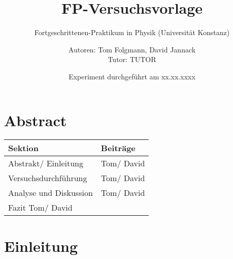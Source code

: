 \documentclass[
    oneside, 
    footinclude=off, 
    captions=tableheading, 
    DIV=12;usenames,
    dvipsnames
]{scrartcl}
\begin{document}
    \title{FP-Versuchsvorlage}
    \subtitle{Fortgeschrittenen-Praktikum in Physik (Universität Konstanz)}
    \author{Autoren: Tom Folgmann, David Jannack \\ \large{Tutor: TUTOR}}
    \date{Experiment durchgeführt am xx.xx.xxxx}
    \maketitle
    \thispagestyle{empty}
    
    \section*{Abstract}
        

    \vspace{2cm}
    \begin{table}[H]
        \centering
            \begin{tabular}{l|l}
            Sektion & Beiträge \\\hline\hline
            Abstrakt/ Einleitung & Tom/ David\\
            Versuchsdurchführung & Tom/ David\\
            Analyse und Diskussion & Tom/ David\\
            Fazit Tom/ David&
        \end{tabular}
    \end{table}

    \newpage


    \tableofcontents
    \thispagestyle{empty}	
    \newpage
    \setcounter{page}{1}


\newpage
\section{Einleitung}
    

%    
\end{document}
